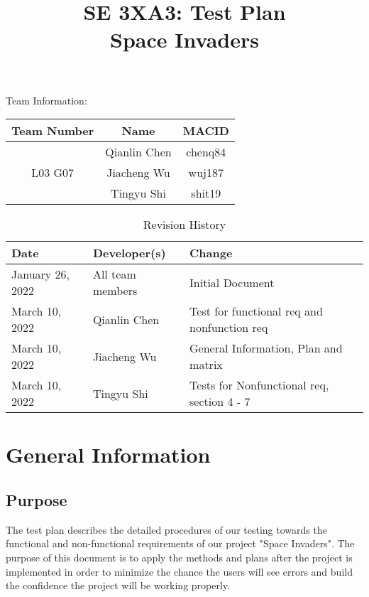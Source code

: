 \documentclass[12pt]{article}
\title{SE 3XA3: Test Plan\\Space Invaders}
\begin{document}
\maketitle

{\Large Team Information:}
\begin{table}[htp]
\centering
{\Large
\begin{tabular}{|c|c|c|}
\hline
\multicolumn{1}{|l|}{Team Number} & Name         & MACID   \\ \hline
\multirow{3}{*}{L03 G07}          & Qianlin Chen & chenq84 \\ \cline{2-3} 
                                  & Jiacheng Wu  & wuj187  \\ \cline{2-3} 
                                  & Tingyu Shi   & shit19  \\ \hline
\end{tabular}
}
\end{table}

\newpage
\begin{table}[htp]
\caption{Revision History} 
\begin{tabularx}{\textwidth}{llX}
\toprule
\textbf{Date} & \textbf{Developer(s)} & \textbf{Change}\\
\midrule
January 26, 2022 & All team members & Initial Document\\
March 10, 2022 & Qianlin Chen & Test for functional req and nonfunction req\\
March 10, 2022 & Jiacheng Wu & General Information, Plan and matrix\\
March 10, 2022 & Tingyu Shi & Tests for Nonfunctional req, section 4 - 7\\
\bottomrule
\end{tabularx}
\end{table}
\newpage
\tableofcontents
\listoftables
\listoffigures
\cleardoublepage
\section{General Information}
\subsection{Purpose}
The test plan describes the detailed procedures of our testing towards the functional and non-functional requirements of our project "Space Invaders". The purpose of this document is to apply the methods and plans after the project is implemented in order to minimize the chance the users will see errors and build the confidence the project will be working properly.
\end{document}
